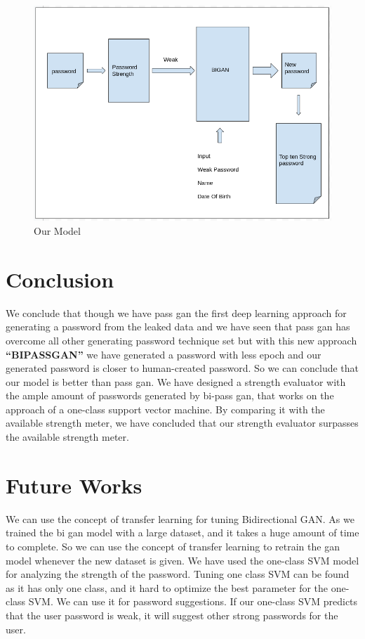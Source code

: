 \documentclass[runningheads]{llncs}
\newcommand{\quotes}[1]{``#1''}
\begin{document}
\begin{figure}
  \centering
\begin{minipage}[b]{0.8\textwidth}
  \begin{mdframed}
    \includegraphics[width=\textwidth]{ab.png}
    \end{mdframed}
    \caption{Our Model}
  \end{minipage}
\end{figure}
\section{Conclusion}

We conclude that though we have pass gan the first deep learning approach for generating a password from the leaked data and we have seen that pass gan has overcome all other generating password technique set but with this new approach \textbf{\quotes{BIPASSGAN}} we have generated a password with less epoch and our generated password is closer to human-created password. So we can conclude that our model is better than pass gan.  We have designed a strength evaluator with the ample amount of passwords generated by bi-pass gan,  that works on the approach of a one-class support vector machine. By comparing it with the available strength meter, we have concluded that our strength evaluator surpasses the available strength meter.

\section{Future Works}
We can use the concept of transfer learning for tuning Bidirectional GAN. As we trained the bi gan model with a large dataset, and it takes a huge amount of time to complete. So we can use the concept of transfer learning to retrain the gan model whenever the new dataset is given. We have used the one-class SVM model for analyzing the strength of the password. Tuning one class SVM can be found as it has only one class, and it hard to optimize the best parameter for the one-class SVM. We can use it for password suggestions. If our one-class SVM predicts that the user password is weak, it will suggest other strong passwords for the user.
\end{document}
